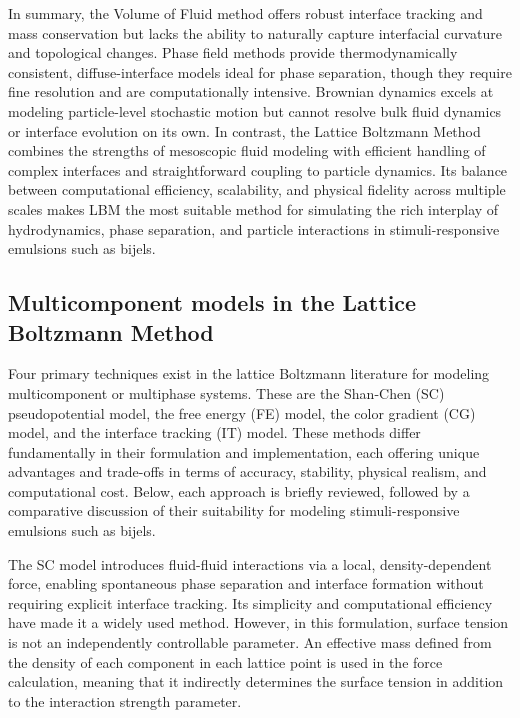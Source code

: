 In summary, the Volume of Fluid method offers robust interface tracking and mass conservation but lacks the ability to naturally capture interfacial curvature and topological changes. 
Phase field methods provide thermodynamically consistent, diffuse-interface models ideal for phase separation, though they require fine resolution and are computationally intensive. 
Brownian dynamics excels at modeling particle-level stochastic motion but cannot resolve bulk fluid dynamics or interface evolution on its own. In contrast, the Lattice Boltzmann Method 
combines the strengths of mesoscopic fluid modeling with efficient handling of complex interfaces and straightforward coupling to particle dynamics. Its balance between computational 
efficiency, scalability, and physical fidelity across multiple scales makes LBM the most suitable method for simulating the rich interplay of hydrodynamics, phase separation, and particle 
interactions in stimuli-responsive emulsions such as bijels.

\subsection{Multicomponent models in the Lattice Boltzmann Method}

Four primary techniques exist in the lattice Boltzmann literature for modeling multicomponent or multiphase systems. These are the Shan-Chen (SC) 
pseudopotential model, the free energy (FE) model, the color gradient (CG) model, and the interface tracking (IT) model.
These methods differ fundamentally in their formulation and implementation, each offering unique advantages and trade-offs in terms of accuracy, 
stability, physical realism, and computational cost. Below, each approach is briefly reviewed, followed by a comparative discussion of their 
suitability for modeling stimuli-responsive emulsions such as bijels.

The SC model introduces fluid-fluid interactions via a local, density-dependent force, enabling spontaneous phase separation and interface 
formation without requiring explicit interface tracking. 
\cite{shan_lattice_1993, shan_simulation_1994, shan_multicomponent_1995, jansen_bijels_2011,gunther_timescales_2014}
Its simplicity and computational efficiency have made it a widely used method. However,
in this formulation, surface tension is not an independently controllable parameter. An effective mass defined from the density of each component
in each lattice point is used in the force calculation, meaning that it indirectly determines the surface tension in addition to the interaction
strength parameter.

